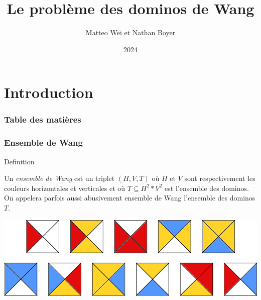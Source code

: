 \documentclass{beamer}
\title{Le problème des dominos de Wang}
\author{Matteo Wei et Nathan Boyer}
\date{2024}
\newcommand{\sube}{\subseteq}
\begin{document}
\frame{\titlepage}

\section{Introduction}

\begin{frame}
    \frametitle{Table des matières}
    \tableofcontents[currentsection]
  \end{frame}
  
\begin{frame}
\frametitle{Ensemble de Wang}

\begin{alertblock}{Definition}

    Un \emph{ensemble de Wang} est un triplet $(H,V,T)$ où $H$ et $V$ sont respectivement les couleurs horizontales et verticales
    et où $T \sube H^2 * V^2$ est l'ensemble des dominos. On appelera parfois aussi abusivement ensemble de Wang l'ensemble des dominos $T$.
    
\end{alertblock}

\includegraphics{ensemble_de_wang_exemple}

\end{frame}
\end{document}
